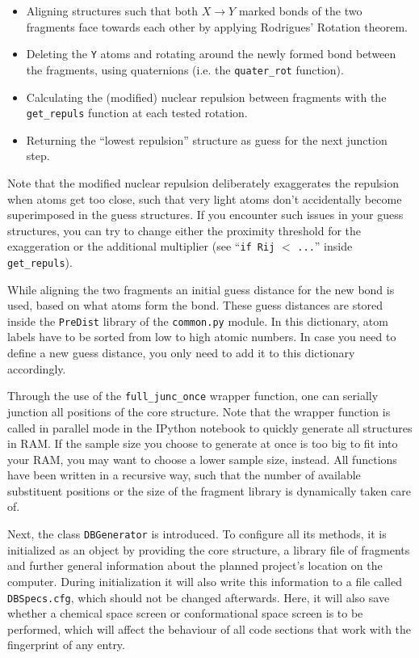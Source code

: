 \documentclass[12pt]{achemso}
\begin{document}
\begin{itemize}
    \item Aligning structures such that both $X\rightarrow{}Y$ marked bonds of the two fragments face towards each other by applying Rodrigues' Rotation theorem.
    \item Deleting the \verb+Y+ atoms and rotating around the newly formed bond between the fragments, using quaternions (i.e. the \texttt{quater\_rot} function).
    \item Calculating the (modified) nuclear repulsion between fragments with the \texttt{get\_repuls} function at each tested rotation.
    \item Returning the ``lowest repulsion'' structure as guess for the next junction step.
\end{itemize}

\noindent Note that the modified nuclear repulsion deliberately exaggerates the repulsion when atoms get too close, such that very light atoms don't accidentally become superimposed in the guess structures.  If you encounter such issues in your guess structures, you can try to change either the proximity threshold for the exaggeration or the additional multiplier (see ``\texttt{if Rij} $<$ \texttt{...}'' inside \texttt{get\_repuls}).

\noindent While aligning the two fragments an initial guess distance for the new bond is used, based on what atoms form the bond. These guess distances are stored inside the \texttt{PreDist} library of the \texttt{common.py} module. In this dictionary, atom labels have to be sorted from low to high atomic numbers. In case you need to define a new guess distance, you only need to add it to this dictionary accordingly.

\noindent Through the use of the \texttt{full\_junc\_once} wrapper function, one can serially junction all positions of the core structure. Note that the wrapper function is called in parallel mode in the IPython notebook to quickly generate all structures in RAM. If the sample size you choose to generate at once is too big to fit into your RAM, you may want to choose a lower sample size, instead. All functions have been written in a recursive way, such that the number of available substituent positions or the size of the fragment library is dynamically taken care of.

\noindent Next, the class \texttt{DBGenerator} is introduced. To configure all its methods, it is initialized as an object by providing the core structure, a library file of fragments and further general information about the planned project's location on the computer. During initialization it will also write this information to a file called \verb+DBSpecs.cfg+, which should not be changed afterwards. Here, it will also save whether a chemical space screen or conformational space screen is to be performed, which will affect the behaviour of all code sections that work with the fingerprint of any entry.
\end{document}
